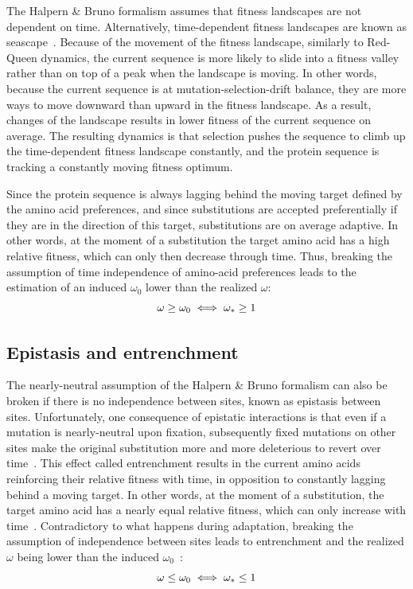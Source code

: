 The Halpern \& Bruno formalism assumes that fitness landscapes are not dependent on time.
Alternatively, time-dependent fitness landscapes are known as seascape~\citep{Mustonen2009}.
Because of the movement of the fitness landscape, similarly to Red-Queen dynamics, the current sequence is more likely to slide into a fitness valley rather than on top of a peak when the landscape is moving.
In other words, because the current sequence is at mutation-selection-drift balance, they are more ways to move downward than upward in the fitness landscape.
As a result, changes of the landscape results in lower fitness of the current sequence on average.
The resulting dynamics is that selection pushes the sequence to climb up the time-dependent fitness landscape constantly, and the protein sequence is tracking a constantly moving fitness optimum.

Since the protein sequence is always lagging behind the moving target defined by the amino acid preferences, and since substitutions are accepted preferentially if they are in the direction of this target, substitutions are on average adaptive.
In other words, at the moment of a substitution the target amino acid has a high relative fitness, which can only then decrease through time.
Thus, breaking the assumption of time independence of amino-acid preferences leads to the estimation of an induced $\omega_0$ lower than the realized $\omega$:
\begin{equation}
    \omega \geq \omega_0 \\
    \iff \omega_* \geq 1
\end{equation}

\subsection{Epistasis and entrenchment}
\label{subsec:epistasis-and-entrenchment}

The nearly-neutral assumption of the Halpern \& Bruno formalism can also be broken if there is no independence between sites, known as epistasis between sites.
Unfortunately, one consequence of epistatic interactions is that even if a mutation is nearly-neutral upon fixation, subsequently fixed mutations on other sites make the original substitution more and more deleterious to revert over time~\citep{Gong2014, Lunzer2010, Mccandlish2013}.
This effect called entrenchment results in the current amino acids reinforcing their relative fitness with time, in opposition to constantly lagging behind a moving target.
In other words, at the moment of a substitution, the target amino acid has a nearly equal relative fitness, which can only increase with time~\citep{Goldstein2016, Goldstein2017}.
Contradictory to what happens during adaptation, breaking the assumption of independence between sites leads to entrenchment and the realized $\omega$ being lower than the induced $\omega_0$~\citep{Rodrigue2016}:
\begin{equation}
    \omega \leq \omega_0 \\
    \iff \omega_* \leq 1
\end{equation}

